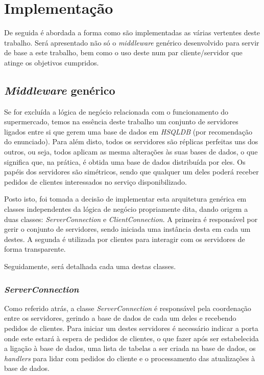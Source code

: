 \documentclass[a4paper]{report}
\begin{document}
\chapter{Implementação} \label{ch:Implementation}
\large{
	De seguida é abordada a forma como são implementadas as várias vertentes deste trabalho. Será apresentado não só o \textit{middleware} genérico desenvolvido para servir de base a este trabalho, bem como o uso deste num par cliente/servidor que atinge os objetivos cumpridos.

	\section{\textit{Middleware} genérico} \label{sec:Middleware}
		Se for excluída a lógica de negócio relacionada com o funcionamento do supermercado, temos na essência deste trabalho um conjunto de servidores ligados entre si que gerem uma base de dados em \textit{HSQLDB} (por recomendação do enunciado). Para além disto, todos os servidores são réplicas perfeitas uns dos outros, ou seja, todos aplicam as mesma alterações às suas bases de dados, o que significa que, na prática, é obtida uma base de dados distribuída por eles. Os papéis dos servidores são simétricos, sendo que qualquer um deles poderá receber pedidos de clientes interessados no serviço disponibilizado.

		Posto isto, foi tomada a decisão de implementar esta arquitetura genérica em classes independentes da lógica de negócio propriamente dita, dando origem a duas classes: \textit{ServerConnection} e \textit{ClientConnection}. A primeira é responsável por gerir o conjunto de servidores, sendo iniciada uma instância desta em cada um destes. A segunda é utilizada por clientes para interagir com os servidores de forma transparente.

		Seguidamente, será detalhada cada uma destas classes.

		\subsection{\textit{ServerConnection}} \label{subsec:ServerConnection}
			Como referido atrás, a classe \textit{ServerConnection} é responsável pela coordenação entre os servidores, gerindo a base de dados de cada um deles e recebendo pedidos de clientes. Para iniciar um destes servidores é necessário indicar a porta onde este estará à espera de pedidos de clientes, o que fazer após ser estabelecida a ligação à base de dados, uma lista de tabelas a ser criada na base de dados, os \textit{handlers} para lidar com pedidos do cliente e o processamento das atualizações à base de dados.
			
}
\end{document}
